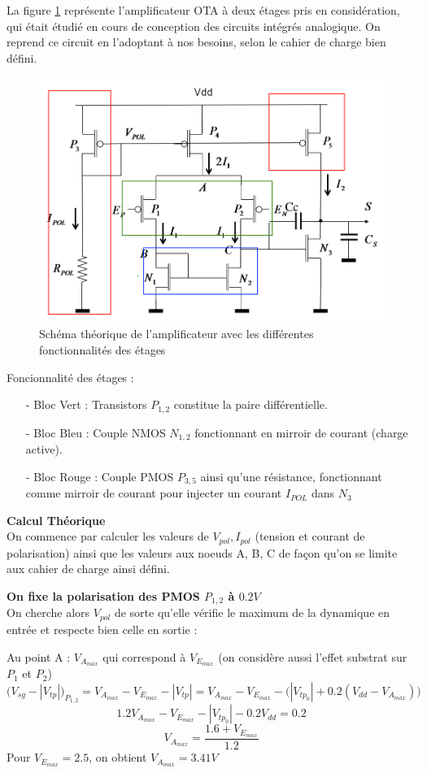 \documentclass[11pt]{article}
\begin{document}
La figure \ref{fig:schemaAOP-OTA} repr\'esente l'amplificateur OTA \`a deux \'etages pris
en consid\'eration, qui \'etait \'etudi\'e en cours de conception des circuits int\'egr\'es analogique\cite{TD4-AOP}.
On reprend ce circuit en l'adoptant \`a nos besoins, selon le cahier de charge bien d\'efini.

\begin{figure}[!htb]
      \centering
      \includegraphics[width=0.6\linewidth]{schema_composition_AOP_2_etages.png}
      \caption{Sch\'ema th\'eorique de l'amplificateur avec les diff\'erentes fonctionnalit\'es des \'etages}
      \label{fig:schemaAOP-OTA}
\end{figure}%

Foncionnalit\'e des \'etages :
\begin{itemize} \itemsep -2pt
\item[-] Bloc Vert : Transistors $P_{1,2}$ constitue la paire diff\'erentielle.
\item[-] Bloc Bleu : Couple NMOS $N_{1,2}$ fonctionnant en mirroir de courant (charge active).
\item[-] Bloc Rouge : Couple PMOS $P_{3,5}$ ainsi qu'une r\'esistance, fonctionnant comme mirroir de courant
  pour injecter un courant $I_{POL}$ dans $N_{3}$
\end{itemize}

\textbf{Calcul Th\'eorique}\\
On commence par calculer les valeurs de $V_{pol}, I_{pol}$ (tension et courant de polarisation)
ainsi que les valeurs aux noeuds A, B, C de fa\c con qu'on se limite aux cahier de charge ainsi d\'efini.

\textbf{On fixe la polarisation des PMOS $P_{1,2}$ \`a $0.2 V$}\\
On cherche alors $V_{pol}$ de sorte qu'elle v\'erifie le maximum de la dynamique en entr\'ee et respecte bien
celle en sortie :

\clearpage

Au point A :
$V_{A_{max}}$ qui correspond \`a $V_{E_{max}}$ (on consid\`ere aussi l'effet substrat sur $P_1$ et $P_2$)
\[
\bigg( V_{sg} - | V_{tp} | \bigg)_{P_{1,2}} = V_{A_{max}} - V_{E_{max}} - |V_{tp}| = V_{A_{max}} - V_{E_{max}} -
\Big( | V_{tp_{0}} | + 0.2(V_{dd} - V_{A_{max}})\Big)
\]
\[
1.2V_{A_{max}} - V_{E_{max}} - | V_{tp_{0}} | - 0.2 V_{dd} = 0.2
\]
\[
V_{A_{max}} = \frac{1.6 + V_{E_{max}}}{1.2}
\]
Pour $V_{E_{max}} = 2.5$, on obtient $V_{A_{max}} = 3.41 V$
\end{document}
